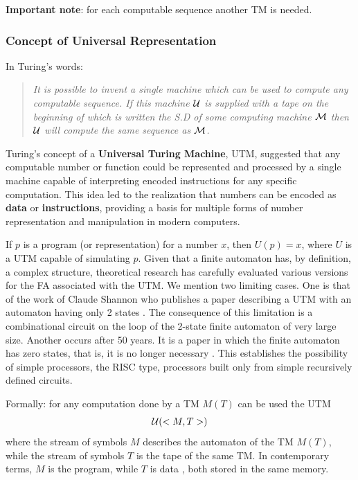 {\bf Important note}: for each computable sequence another TM is needed.

\subsubsection{Concept of Universal Representation}

In Turing's words:
\begin{quote}
{\em It is possible to invent a single machine which can be used to compute
any computable sequence. If this machine $\cal U$ is supplied with a tape on
the beginning of which is written the S.D of some computing machine $\cal M$
then $\cal U$ will compute the same sequence as $\cal M$.} \cite{Turing36}
\end{quote}

Turing’s concept of a \textbf{Universal Turing Machine}, UTM, suggested that any computable number or function could be represented and processed by a single machine capable of interpreting encoded instructions for any specific computation. This idea led to the realization that numbers can be encoded as \textbf{data} or \textbf{instructions}, providing a basis for multiple forms of number representation and manipulation in modern computers.

If \( p \) is a program (or representation) for a number \( x \), then \( U(p) = x \), where \( U \) is a UTM capable of simulating \( p \). Given that a finite automaton has, by definition, a complex structure, theoretical research has carefully evaluated various versions for the FA associated with the UTM. We mention two limiting cases. One is that of the work of Claude Shannon who publishes a paper describing a UTM with an automaton having only 2 states \cite{Shannon56}. The consequence of this limitation is a combinational circuit on the loop of the 2-state finite automaton of very large size. Another occurs after 50 years. It is  a paper in which the finite automaton has zero states, that is, it is no longer necessary \cite{Stefan06Turing}. This establishes the possibility of simple processors, the RISC type, processors built only from simple recursively defined circuits.  

Formally: for any computation done by a TM $M(T)$ can be used the UTM $${\cal U}(<M,T>)$$ where the stream of symbols $M$ describes the automaton of the TM $M(T)$, while the stream of symbols $T$ is the tape of the same TM. In contemporary terms, $M$ is the program, while $T$ is data , both stored in the same memory.

